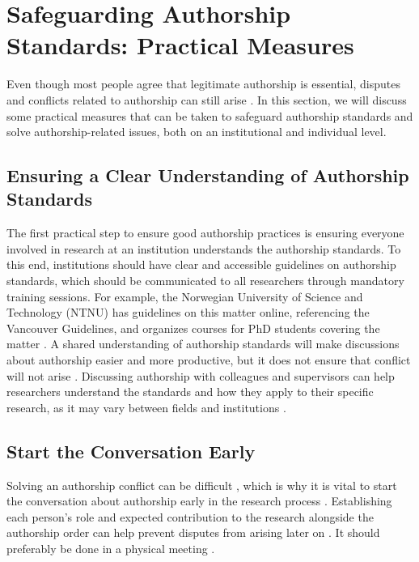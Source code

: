 \pagebreak
\section{Safeguarding Authorship Standards: Practical Measures}
Even though most people agree that legitimate authorship is essential, disputes and conflicts related to authorship can still arise \cite{pilebergCoauthorshipExpertsHave2022}.
In this section, we will discuss some practical measures that can be taken to safeguard authorship standards and solve authorship-related issues, both on an institutional and individual level.

\subsection{Ensuring a Clear Understanding of Authorship Standards}
The first practical step to ensure good authorship practices is ensuring everyone involved in research at an institution understands the authorship standards.
To this end, institutions should have clear and accessible guidelines on authorship standards, which should be communicated to all researchers through mandatory training sessions.
For example, the Norwegian University of Science and Technology (NTNU) has guidelines on this matter online, referencing the Vancouver Guidelines, and organizes courses for PhD students covering the matter \cite{ntnuCoauthorshipKnowledgeBase} \cite{ntnuCourseResearchEthics}.
A shared understanding of authorship standards will make discussions about authorship easier and more productive, but it does not ensure that conflict will not arise \cite{pilebergCoauthorshipExpertsHave2022}.
Discussing authorship with colleagues and supervisors can help researchers understand the standards and how they apply to their specific research, as it may vary between fields and institutions \cite{pilebergCoauthorshipExpertsHave2022}.

\subsection{Start the Conversation Early}
Solving an authorship conflict can be difficult \cite{faulkesResolvingAuthorshipDisputes2018}, which is why it is vital to start the conversation about authorship early in the research process \cite{pilebergCoauthorshipExpertsHave2022} \cite{albertHowHandleAuthorship2003}.
Establishing each person's role and expected contribution to the research alongside the authorship order can help prevent disputes from arising later on \cite{albertHowHandleAuthorship2003}.
It should preferably be done in a physical meeting \cite{albertHowHandleAuthorship2003}.


